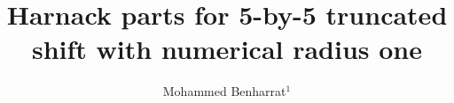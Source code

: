 \documentclass[12pt, reqno]{amsart}
\theoremstyle{definition}
\theoremstyle{remark}
\numberwithin{equation}{section}
\begin{document}
\setcounter{page}{1}



\title[Harnack parts for 5-by-5 truncated shift]
      {Harnack parts for 5-by-5 truncated shift with numerical radius one}
       
\author[ M. Benharrat]{Mohammed Benharrat$^{1}$}
\address{$^{1}$ Ecole Nationale Polytechnique d'Oran-Maurice Audin (Ex. ENSET d'Oran), 
	BP 1523 Oran-El M'naouar, 31000 Oran, Alg\'{e}rie.
 Laboratory of Fundamental and Applicable Mathematics of Oran (LMFAO)}
\email{\textcolor[rgb]{0.00,0.00,0.84}{mohammed.benharrat@enp-oran.dz}}



\end{document}
